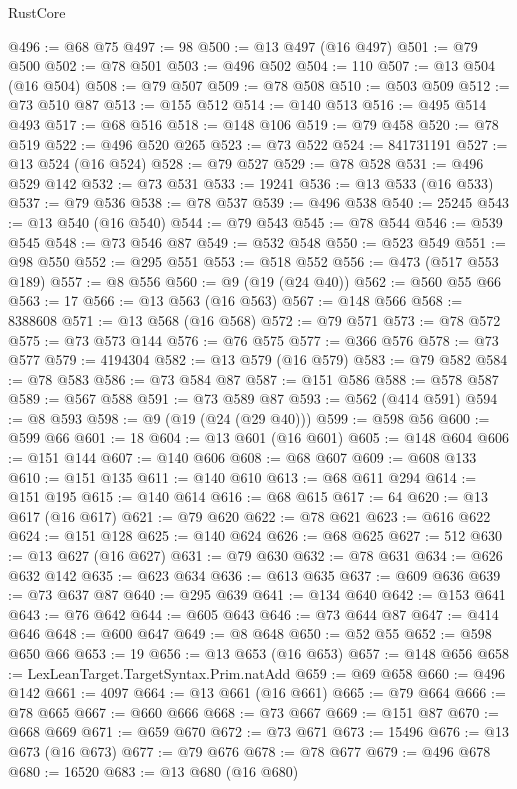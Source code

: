 \begin{lexlean}{RustCore}
\begin{coremodule}
@496 := @68 @75
@497 := 98
@500 := @13 @497 (@16 @497)
@501 := @79 @500
@502 := @78 @501
@503 := @496 @502
@504 := 110
@507 := @13 @504 (@16 @504)
@508 := @79 @507
@509 := @78 @508
@510 := @503 @509
@512 := @73 @510 @87
@513 := @155 @512
@514 := @140 @513
@516 := @495 @514 @493
@517 := @68 @516
@518 := @148 @106
@519 := @79 @458
@520 := @78 @519
@522 := @496 @520 @265
@523 := @73 @522
@524 := 841731191
@527 := @13 @524 (@16 @524)
@528 := @79 @527
@529 := @78 @528
@531 := @496 @529 @142
@532 := @73 @531
@533 := 19241
@536 := @13 @533 (@16 @533)
@537 := @79 @536
@538 := @78 @537
@539 := @496 @538
@540 := 25245
@543 := @13 @540 (@16 @540)
@544 := @79 @543
@545 := @78 @544
@546 := @539 @545
@548 := @73 @546 @87
@549 := @532 @548
@550 := @523 @549
@551 := @98 @550
@552 := @295 @551
@553 := @518 @552
@556 := @473 (@517 @553 @189)
@557 := @8 @556
@560 := @9 (@19 (@24 @40))
@562 := @560 @55 @66
@563 := 17
@566 := @13 @563 (@16 @563)
@567 := @148 @566
@568 := 8388608
@571 := @13 @568 (@16 @568)
@572 := @79 @571
@573 := @78 @572
@575 := @73 @573 @144
@576 := @76 @575
@577 := @366 @576
@578 := @73 @577
@579 := 4194304
@582 := @13 @579 (@16 @579)
@583 := @79 @582
@584 := @78 @583
@586 := @73 @584 @87
@587 := @151 @586
@588 := @578 @587
@589 := @567 @588
@591 := @73 @589 @87
@593 := @562 (@414 @591)
@594 := @8 @593
@598 := @9 (@19 (@24 (@29 @40)))
@599 := @598 @56
@600 := @599 @66
@601 := 18
@604 := @13 @601 (@16 @601)
@605 := @148 @604
@606 := @151 @144
@607 := @140 @606
@608 := @68 @607
@609 := @608 @133
@610 := @151 @135
@611 := @140 @610
@613 := @68 @611 @294
@614 := @151 @195
@615 := @140 @614
@616 := @68 @615
@617 := 64
@620 := @13 @617 (@16 @617)
@621 := @79 @620
@622 := @78 @621
@623 := @616 @622
@624 := @151 @128
@625 := @140 @624
@626 := @68 @625
@627 := 512
@630 := @13 @627 (@16 @627)
@631 := @79 @630
@632 := @78 @631
@634 := @626 @632 @142
@635 := @623 @634
@636 := @613 @635
@637 := @609 @636
@639 := @73 @637 @87
@640 := @295 @639
@641 := @134 @640
@642 := @153 @641
@643 := @76 @642
@644 := @605 @643
@646 := @73 @644 @87
@647 := @414 @646
@648 := @600 @647
@649 := @8 @648
@650 := @52 @55
@652 := @598 @650 @66
@653 := 19
@656 := @13 @653 (@16 @653)
@657 := @148 @656
@658 := LexLeanTarget.TargetSyntax.Prim.natAdd
@659 := @69 @658
@660 := @496 @142
@661 := 4097
@664 := @13 @661 (@16 @661)
@665 := @79 @664
@666 := @78 @665
@667 := @660 @666
@668 := @73 @667
@669 := @151 @87
@670 := @668 @669
@671 := @659 @670
@672 := @73 @671
@673 := 15496
@676 := @13 @673 (@16 @673)
@677 := @79 @676
@678 := @78 @677
@679 := @496 @678
@680 := 16520
@683 := @13 @680 (@16 @680)

\end{coremodule}
\end{lexlean}
